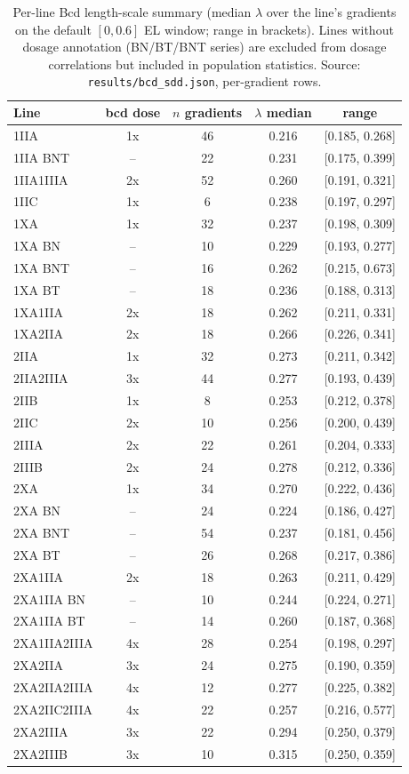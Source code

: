\begin{table}[!htbp]
\centering
\caption{Per-line Bcd length-scale summary (median $\lambda$ over the line's
gradients on the default $[0,0.6]$ EL window; range in brackets). Lines
without dosage annotation (BN/BT/BNT series) are excluded from dosage
correlations but included in population statistics. Source:
\texttt{results/bcd\_sdd.json}, per-gradient rows.}
\label{tab:lines}
\small
\begin{tabular}{lcccc}
\toprule
Line & bcd dose & $n$ gradients & $\lambda$ median & range \\
\midrule
1IIA & 1x & 46 & 0.216 & [0.185, 0.268] \\
1IIA BNT & -- & 22 & 0.231 & [0.175, 0.399] \\
1IIA1IIIA & 2x & 52 & 0.260 & [0.191, 0.321] \\
1IIC & 1x & 6 & 0.238 & [0.197, 0.297] \\
1XA & 1x & 32 & 0.237 & [0.198, 0.309] \\
1XA BN & -- & 10 & 0.229 & [0.193, 0.277] \\
1XA BNT & -- & 16 & 0.262 & [0.215, 0.673] \\
1XA BT & -- & 18 & 0.236 & [0.188, 0.313] \\
1XA1IIA & 2x & 18 & 0.262 & [0.211, 0.331] \\
1XA2IIA & 2x & 18 & 0.266 & [0.226, 0.341] \\
2IIA & 1x & 32 & 0.273 & [0.211, 0.342] \\
2IIA2IIIA & 3x & 44 & 0.277 & [0.193, 0.439] \\
2IIB & 1x & 8 & 0.253 & [0.212, 0.378] \\
2IIC & 2x & 10 & 0.256 & [0.200, 0.439] \\
2IIIA & 2x & 22 & 0.261 & [0.204, 0.333] \\
2IIIB & 2x & 24 & 0.278 & [0.212, 0.336] \\
2XA & 1x & 34 & 0.270 & [0.222, 0.436] \\
2XA BN & -- & 24 & 0.224 & [0.186, 0.427] \\
2XA BNT & -- & 54 & 0.237 & [0.181, 0.456] \\
2XA BT & -- & 26 & 0.268 & [0.217, 0.386] \\
2XA1IIA & 2x & 18 & 0.263 & [0.211, 0.429] \\
2XA1IIA BN & -- & 10 & 0.244 & [0.224, 0.271] \\
2XA1IIA BT & -- & 14 & 0.260 & [0.187, 0.368] \\
2XA1IIA2IIIA & 4x & 28 & 0.254 & [0.198, 0.297] \\
2XA2IIA & 3x & 24 & 0.275 & [0.190, 0.359] \\
2XA2IIA2IIIA & 4x & 12 & 0.277 & [0.225, 0.382] \\
2XA2IIC2IIIA & 4x & 22 & 0.257 & [0.216, 0.577] \\
2XA2IIIA & 3x & 22 & 0.294 & [0.250, 0.379] \\
2XA2IIIB & 3x & 10 & 0.315 & [0.250, 0.359] \\

\bottomrule
\end{tabular}
\end{table}

